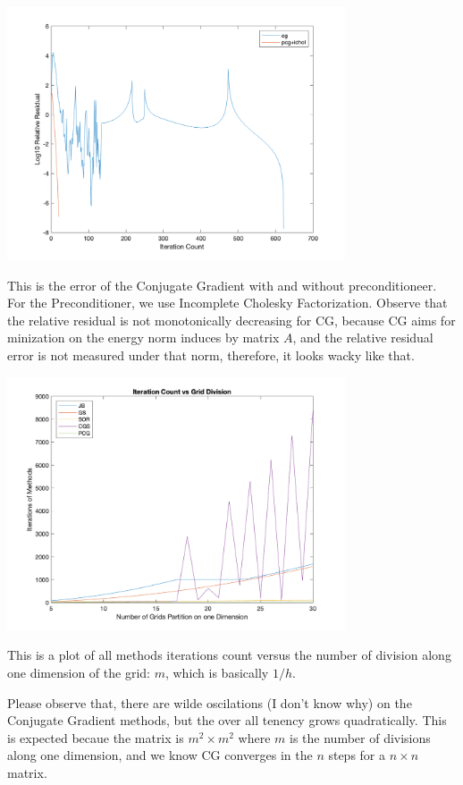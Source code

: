 \documentclass[]{article}
\begin{document}
    \begin{center}
        \includegraphics[width=10cm]{pcg_vs_cgs_itr.png}
    \end{center}
    \par
    This is the error of the Conjugate Gradient with and without preconditioneer. For the Preconditioner, we use Incomplete Cholesky Factorization. Observe that the relative residual is not monotonically decreasing for CG, because CG aims for minization on the energy norm induces by matrix $A$, and the relative residual error is not measured under that norm, therefore, it looks wacky like that. 
    \begin{center}
        \includegraphics[width=10cm]{h_vs_methods_itr.png}
    \end{center}
    This is a plot of all methods iterations count versus the number of division along one dimension of the grid: $m$, which is basically $1/h$. 
    \par
    Please observe that, there are wilde oscilations (I don't know why) on the Conjugate Gradient methods, but the over all tenency grows quadratically. This is expected becaue the matrix is $m^2\times m^2$ where $m$ is the number of divisions along one dimension, and we know CG converges in the $n$ steps for a $n\times n$ matrix. 
\end{document}
